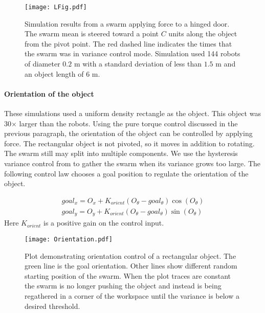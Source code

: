 \begin{figure}
\begin{center}
	\texttt{[image: LFig.pdf]}
\end{center}
\vspace{-1em}
\caption{\label{fig:LFig}
Simulation results from a swarm applying force to a hinged door. 
The swarm mean is steered toward a point $C$ units along the object from the pivot point. The red dashed line indicates the times that the swarm was in variance control mode.
 Simulation used 144 robots of diameter $0.2$ m with a standard deviation of less than $1.5$ m and an object length of $6$ m.
}
\vspace{-1em}
\end{figure}


\paragraph{Orientation of the object}
These simulations used a uniform density rectangle as the object. This object was 30$\times$ larger than the robots.
Using the pure torque control discussed in the previous paragraph, the orientation of the object can be controlled by applying force. 
The rectangular object is not pivoted, so it moves in addition to rotating. 
 The swarm still may split into multiple components.
  We use the hysteresis variance control from \cite{ShahrokhiIROS2015}  to gather the swarm when its variance grows too large. 
  The following control law chooses a goal position to regulate the orientation of the object.  
  
 \begin{align}\nonumber
goal_x = O_x +  K_{orient}  (O_{\theta} - goal_\theta ) \cos(O_{\theta}) \\
goal_y = O_y +  K_{orient}  ( O_{\theta} -goal_\theta  ) \sin(O_{\theta})
\end{align}
Here $K_{orient}$ is a positive gain on the control input.  


\begin{figure}
\begin{center}
	\texttt{[image: Orientation.pdf]}
\end{center}
\vspace{-1em}
\caption{\label{fig:OrientCont}
Plot demonstrating  orientation control of a rectangular object. The green line is the goal orientation. Other lines show different random starting position of the swarm. When the plot traces are constant the swarm is no longer pushing the object and instead is being regathered in a corner of the workspace until the variance is below a desired threshold. 
}
\vspace{-1em}
\end{figure}

